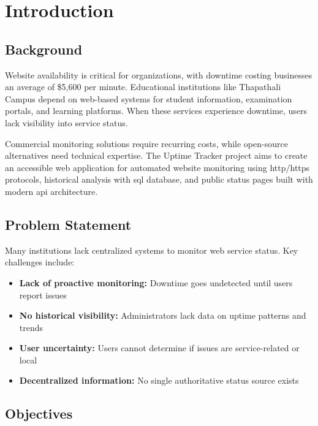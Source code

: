 \chapter{Introduction}

\section{Background}

Website availability is critical for organizations, with downtime costing businesses an average of \$5,600 per minute. Educational institutions like Thapathali Campus depend on web-based systems for student information, examination portals, and learning platforms. When these services experience downtime, users lack visibility into service status.

Commercial monitoring solutions require recurring costs, while open-source alternatives need technical expertise. The Uptime Tracker project aims to create an accessible web application for automated website monitoring using \gls{http}/\gls{https} protocols, historical analysis with \gls{sql} database, and public status pages built with modern \gls{api} architecture.

\section{Problem Statement}

Many institutions lack centralized systems to monitor web service status. Key challenges include:
\begin{itemize}
    \item \textbf{Lack of proactive monitoring:} Downtime goes undetected until users report issues
    \item \textbf{No historical visibility:} Administrators lack data on uptime patterns and trends
    \item \textbf{User uncertainty:} Users cannot determine if issues are service-related or local
    \item \textbf{Decentralized information:} No single authoritative status source exists
\end{itemize}

\section{Objectives}

